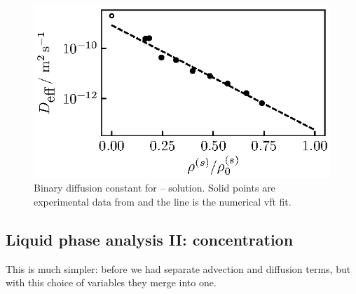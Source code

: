 \documentclass[11pt,twoside]{report}
\begin{document}
\begin{figure}
  \includegraphics[width=\linewidth]{diffusion-fit-nano3}
  \caption{Binary diffusion constant for -- solution.
  Solid points are experimental data from \cite{???} and the line is the numerical vft fit.}
\end{figure}

\subsection{Liquid phase analysis II: concentration}

This is much simpler: before we had separate advection and diffusion terms, but with this choice of variables they merge into one.
\end{document}
